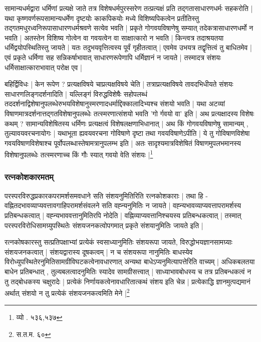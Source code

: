 सामान्यधर्मद्वारा धर्मिणां प्रत्यक्षे जाते तत्र विशेषधर्मपुरस्सरेण तत्प्रत्यक्षं प्रति तद्गतासाधारणधर्मः सहकरोति | यथा कृष्णवर्णरूपसामान्यधर्मेण दृष्टयोः काकपिकयोः मध्ये विशिष्यपिकत्वेन प्रतीतिस्तु तद्गतमधुरध्वनिरूपासाधारणधर्मश्रवणे सत्येव भवति | प्रकृते गोगवयविषाणेषु सम्यात् तदेकत्रासाधारणधर्मो न भवति | अतस्तेन विशिष्य गोत्वेन वा गवयत्वेन वा साक्षात्कारो न भवति | किन्त्वत्र तदाश्रयतया धर्मिद्वयोपस्थितिस्तु जायते | यतः तदुभयवृत्तित्वस्य पूर्वं गृहीतत्वात् | एवमेव उभयत्र तद्वृत्तित्वं तु बाधितमेव | एवं प्रकृते धर्मिणा सह सन्निकर्षाभावात् साधारणरूपेणापि धर्मिज्ञानं न जायते | तस्मादत्र संशयः धर्मिसाक्षात्काराभावात् परोक्ष एव |

{\fontsize{11.7}{0}\selectfont\s बहिर्द्विविधः | केन रूपेण ?‌ प्रत्यक्षविषये चाप्रत्यक्षविषये चेति | तत्राप्रत्यक्षविषये तावदभिधीयते संशयः साधारणलिङ्गदर्शनादिति | यल्लिङ्गं विरुद्धविशेषैः‌ सहोपलब्धं तददर्शनाद्विशेषानुपलब्धेरुभयविशेषानुस्मरणादधर्माद्दिक्कालादिभ्यश्च संशयो भवति | यथा अटव्यां‌ विषाणमात्रदर्शनात्तद्गतविशेषानुपलब्धेः तत्स्मरणात्संशयो भवति 'गो र्गवयो वा' इति | अथ प्रत्यक्षादस्य विशेषः कथम् ? सामान्यविशेषितस्य धर्मिणः प्रत्यक्षत्वं विशेषलक्षणाभिधानात् | अथ किं गोगवयविषाणेषु सामान्यम् , तुल्यावयवरचनायोगः | यथाभूता ह्यवयवरचना गोविषाणे दृष्टा तथा गवयविषाणेऽपीति | ये तु गोविषाणविशेषा गवयविषाणविशेषाश्च पूर्वोपलब्धास्तेषामत्रानुपलम्भ इति | अतः सादृश्यमात्रविशेषितं विषाणमुपलभमानस्य विशेषानुपलब्धेः तत्स्मरणाच्च किं गौः स्यात् गवयो वेति संशयः |\footnote{व्यो . ५३६,५३७}}

\subsubsection{रत्नकोशकारमतम्}

परस्परविरुद्धप्रकारकपरामर्शसमवधाने सति संशयनुमितिरिति रत्नकोशकाराः | तथा हि - वह्नितदभावव्याप्यवत्तावगाहिपरामर्शसंवलने सति वह्न्यनुमितिः न जायते | वह्न्यभावव्याप्यवत्तापरामर्शस्य प्रतिबन्धकत्वात् | वह्न्यभाववत्तानुमितिरपि नोदेति | वह्निव्याप्यवत्तानिश्चयस्य प्रतिबन्धकत्वात् | तस्मात् परस्परविरोधिसामग्र्युपस्थितेः संशयजनकत्वोपगमात् प्रकृते संशयानुमितिः जायते इति |

{\fontsize{11.7}{0}\selectfont\s रत्नकोषकारस्तु सत्प्रतिपक्षाभ्यां प्रत्येकं स्वसाध्यानुमितिः संशयरूपा जायते, विरुद्धोभयज्ञानसामग्र्याः संशयजनकत्वात् | संशयद्वारास्य दूषकत्वम् | न च संशयरूपा नानुमितिः बाधस्येव विरोध्युपस्थितेरनुमितिसामग्रीविघटकत्वेनावधारणात् अन्यथा बाधेऽप्यनुमित्यापत्तेरिति वाच्यम् | अधिकबलतया बाधेन प्रतिबन्धात् , तुल्यबलत्वादनुमितिः स्यादेव सामग्रीसत्त्वात् | साध्याभावबोधस्य च तत्र प्रतिबन्धकत्वं न तु तद्बोधकस्य चक्षुरादेः | प्रत्येकं निर्णायकत्वेनावधारितात्कथं संशय इति चेन्न | प्रत्येकाद्धि ज्ञानमुत्पद्यमानं अर्थात् संशयो न तु प्रत्येकं संशयजनकत्वमिति मेने |\footnote{स.त.म. ६०}}

